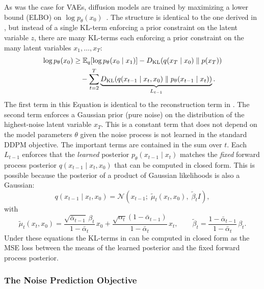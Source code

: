 As was the case for VAEs, diffusion models are trained by maximizing a lower bound (ELBO) on $\log p_\theta(x_0)$~\cite{kingma2021variational}.
The structure is identical to the one derived in , but instead of a single KL-term enforcing a prior constraint on the latent variable $z$, there are many KL-terms each enforcing a prior constraint on the many latent variables $x_1, \ldots, x_T$:
\begin{align}
    \log p_\theta(x_0)
    &\geq \mathbb{E}_{q}\!\left[\log p_\theta(x_0 \mid x_1)\right]
      - D_\text{KL}\!\left(q(x_T \mid x_0) \;\|\; p(x_T)\right) \notag \\
    &\quad - \sum_{t=2}^{T} \underbrace{D_\text{KL}\!\left(q(x_{t-1} \mid x_t, x_0) \;\|\; p_\theta(x_{t-1} \mid x_t)\right)}_{L_{t-1}}.
    \label{eqn:ddpm_elbo}
\end{align}
The first term in this Equation is identical to the reconstruction term in .
The second term enforces a Gaussian prior (pure noise) on the distribution of the highest-noise latent variable $x_T$.
This is a constant term that does not depend on the model parameters $\theta$ given the noise process is not learned in the standard DDPM objective.
The important terms are contained in the sum over $t$.
Each $L_{t-1}$ enforces that the \textit{learned} posterior $p_\theta(x_{t-1} \mid x_t)$ matches the \textit{fixed} forward process posterior $q(x_{t-1} \mid x_t, x_0)$ that can be computed in closed form.
This is possible because the posterior of a product of Gaussian likelihoods is also a Gaussian:
\begin{equation}
    q(x_{t-1} \mid x_t, x_0)
    = \mathcal{N}\!\left(x_{t-1};\; \tilde\mu_t(x_t, x_0),\; \tilde\beta_t I\right),
    \label{eqn:forward_posterior}
\end{equation}
with
\begin{equation}
    \tilde\mu_t(x_t, x_0)
    = \frac{\sqrt{\bar\alpha_{t-1}}\,\beta_t}{1 - \bar\alpha_t}\,x_0
      + \frac{\sqrt{\alpha_t}(1 - \bar\alpha_{t-1})}{1 - \bar\alpha_t}\,x_t,
    \qquad
    \tilde\beta_t = \frac{1 - \bar\alpha_{t-1}}{1 - \bar\alpha_t}\,\beta_t.
    \label{eqn:posterior_mean}
\end{equation}
Under these equations the KL-terms in  can be computed in closed form as the MSE loss between the means of the learned posterior and the fixed forward process posterior.

\subsubsection{The Noise Prediction Objective}


